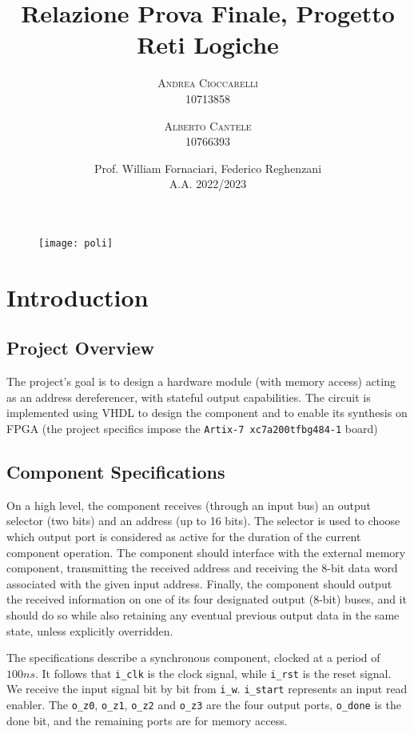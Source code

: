 \documentclass[12pt,a4paper]{article}
\title{
	Relazione Prova Finale, Progetto Reti Logiche
}
\author{
	\textsc{
		\normalsize{Andrea Cioccarelli}
	}\\
	\normalsize{10713858} 
	\and
	\textsc{
		\normalsize{Alberto Cantele}
	}\\
	\normalsize{10766393}
}
\date{
	\vspace{0.2cm}
	Prof. William Fornaciari, Federico Reghenzani\\ 
	A.A. 2022/2023
}
\newcommand{\code}{\texttt}
\begin{document}
	\maketitle
	\begin{figure}
		\centering
		\texttt{[image: poli]}
	\end{figure}
	
	\tableofcontents
	
	\newpage
	
	\section{Introduction}
	
	\subsection{Project Overview}
	
	The project's goal is to design a hardware module (with memory access) acting as an address dereferencer, with stateful output capabilities.
	The circuit is implemented using VHDL to design the component and to enable its synthesis on FPGA (the project specifics impose the \code{Artix-7 xc7a200tfbg484-1} board)
	
	
	\subsection{Component Specifications}
	
	On a high level, the component receives (through an input bus) an output selector (two bits) and an address (up to 16 bits).
	The selector is used to choose which output port is considered as active for the duration of the current component operation. 
	The component should interface with the external memory component, transmitting the received address and receiving the 8-bit data word associated with the given input address. 
        Finally, the component should output the received information on one of its four designated output (8-bit) buses, and it should do so while also retaining any eventual previous output data in the same state, unless explicitly overridden.
	
	The specifications describe a synchronous component, clocked at a period of $100ns$. It follows that \code{i\_clk} is the clock signal, while \code{i\_rst} is the reset signal. We receive the input signal bit by bit from \code{i\_w}. \code{i\_start} represents an input read enabler. The \code{o\_z0}, \code{o\_z1}, \code{o\_z2} and \code{o\_z3} are the four output ports, \code{o\_done} is the done bit, and the remaining ports are for memory access.
	
\end{document}
